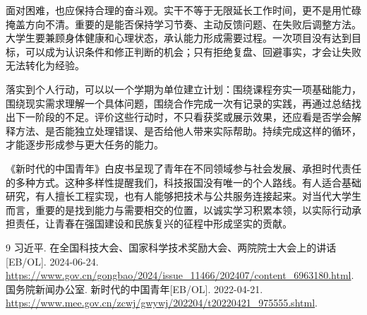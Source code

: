 \documentclass[UTF8,a4paper,zihao=-4,fontset=fandol]{ctexart}
\begin{document}
面对困难，也应保持合理的奋斗观。实干不等于无限延长工作时间，更不是用忙碌掩盖方向不清。重要的是能否保持学习节奏、主动反馈问题、在失败后调整方法。大学生要兼顾身体健康和心理状态，承认能力形成需要过程。一次项目没有达到目标，可以成为认识条件和修正判断的机会；只有拒绝复盘、回避事实，才会让失败无法转化为经验。

落实到个人行动，可以以一个学期为单位建立计划：围绕课程夯实一项基础能力，围绕现实需求理解一个具体问题，围绕合作完成一次有记录的实践，再通过总结找出下一阶段的不足。评价这些行动时，不只看获奖或展示效果，还应看是否学会解释方法、是否能独立处理错误、是否给他人带来实际帮助。持续完成这样的循环，才能逐步形成参与更大任务的能力。

《新时代的中国青年》白皮书呈现了青年在不同领域参与社会发展、承担时代责任的多种方式\cite{youth}。这种多样性提醒我们，科技报国没有唯一的个人路线。有人适合基础研究，有人擅长工程实现，也有人能够把技术与公共服务连接起来。对当代大学生而言，重要的是找到能力与需要相交的位置，以诚实学习积累本领，以实际行动承担责任，让青春在强国建设和民族复兴的征程中形成坚实的贡献。

\begin{thebibliography}{9}
\fontsize{10.5bp}{15.75bp}\selectfont
{} 习近平. 在全国科技大会、国家科学技术奖励大会、两院院士大会上的讲话[EB/OL]. 2024-06-24. \url{https://www.gov.cn/gongbao/2024/issue_11466/202407/content_6963180.html}.
 国务院新闻办公室. 新时代的中国青年[EB/OL]. 2022-04-21. \url{https://www.mee.gov.cn/zcwj/gwywj/202204/t20220421_975555.shtml}.
\end{thebibliography}
\end{document}
